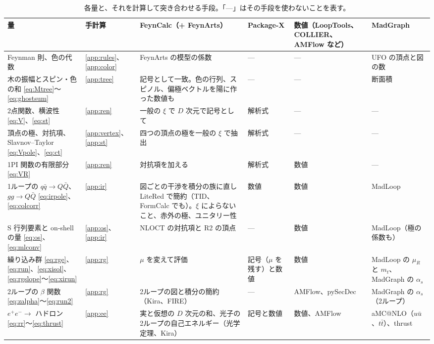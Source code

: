\documentclass[a4paper,10pt]{ltjsarticle}
\begin{document}
\begin{table}[tbp]
\centering\small
\caption{各量と、それを計算して突き合わせる手段。「—」はその手段を使わないことを表す。}
\label{tab:plan}
\begin{tabularx}{\linewidth}{>{\raggedright\arraybackslash}p{3.4cm}>{\raggedright\arraybackslash}p{1.3cm}>{\raggedright\arraybackslash}X>{\raggedright\arraybackslash}p{1.75cm}>{\raggedright\arraybackslash}p{1.75cm}>{\raggedright\arraybackslash}p{2.0cm}}
\toprule
\textbf{量} & \textbf{手計算} & \textbf{FeynCalc（+ FeynArts）} & \textbf{Package-X} & \textbf{数値（LoopTools、COLLIER、AMFlow など）} & \textbf{MadGraph} \\
\midrule
Feynman 則、色の代数 & \ref{app:rules}、\ref{app:color} & FeynArts の模型の係数 & — & — & UFO の頂点と図の数 \\
木の振幅とスピン・色の和 \eqref{eq:Mtree}〜\eqref{eq:ghostsum} & \ref{app:tree} & 記号として一致。色の行列、スピノル、偏極ベクトルを陽に作った数値も & — & — & 断面積 \\
2点関数、横波性 \eqref{eq:V}、\eqref{eq:st} & \ref{app:ren} & 一般の $\xi$ で $D$ 次元で記号として & 解析式 & — & — \\
頂点の極、対抗項、Slavnov--Taylor \eqref{eq:Vpole}、\eqref{eq:ct} & \ref{app:vertex}、\ref{app:st} & 四つの頂点の極を一般の $\xi$ で抽出 & 解析式 & — & — \\
1PI 関数の有限部分 \eqref{eq:VR} & \ref{app:ren} & 対抗項を加える & 解析式 & 数値 & — \\
1ループの $q\bar q\to Q\bar Q$、$gg\to Q\bar Q$ \eqref{eq:irpole}、\eqref{eq:colcorr} & \ref{app:ir} & 図ごとの干渉を積分の族に直し LiteRed で簡約（TID、FormCalc でも）。$\xi$ によらないこと、赤外の極、ユニタリー性 & 数値 & 数値 & MadLoop \\
S 行列要素と on-shell の量 \eqref{eq:os}、\eqref{eq:mlconv} & \ref{app:os}、\ref{app:ir} & NLOCT の対抗項と R2 の頂点 & — & 数値 & MadLoop（極の係数も） \\
繰り込み群 \eqref{eq:rge}、\eqref{eq:run}、\eqref{eq:xisol}、\eqref{eq:rgslope}〜\eqref{eq:xirun} & \ref{app:rg} & $\mu$ を変えて評価 & 記号（$\mu$ を残す）と数値 & 数値 & MadLoop の $\mu_R$ と $m_t$、MadGraph の $\alpha_s$ \\
2ループの $\beta$ 関数 \eqref{eq:zalpha}〜\eqref{eq:run2} & \ref{app:rg} & 2ループの図と積分の簡約（Kira、FIRE） & — & AMFlow、pySecDec & MadGraph の $\alpha_s$（2ループ） \\
$e^+e^-\to$ ハドロン \eqref{eq:rr}〜\eqref{eq:thrust} & \ref{app:ee} & 実と仮想の $D$ 次元の和、光子の2ループの自己エネルギー（光学定理、Kira） & 記号と数値 & 数値、AMFlow & aMC@NLO（$u\bar u$、$t\bar t$）、thrust \\

\end{tabularx}
\end{table}
\end{document}
